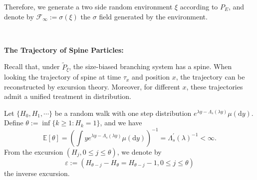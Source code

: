 \documentclass[]{article}
\numberwithin{equation}{section}
\theoremstyle{thmstyleone}%
\theoremstyle{thmstyletwo}%
\theoremstyle{thmstylethree}%
\theoremstyle{thmstylefour}%
\theoremstyle{thmstylefive}%
\theoremstyle{thmstylesix}%
\renewcommand{\d}{\mathrm{d}}
\newcommand{\E}{\mathbb{E}}
\begin{document}
	
	Therefore, we generate a two side random environment $\xi$ according to $P_E$, and denote by $\mathcal{F}_\infty:=\sigma(\xi)$ the $\sigma$ field generated by the environment.
	
	\
	
	\noindent\textbf{The Trajectory of Spine Particles:}
	
	Recall that, under $\tilde{P}_\xi$, the size-biased branching system has a spine. When looking the trajectory of spine at time $\tau_x$ and position $x$, the trajectory can be reconstructed by excursion theory. Moreover, for different $x$, these trajectories admit a unified treatment in distribution.
	
	Let $\{H_0,H_1,\cdots\}$ be a random walk with one step distribution $e^{\lambda y-\Lambda_s(\lambda y)} \mu(\d y)$. Define $\theta:= \inf\{k\geqslant1:H_k=1\}$, and we have \begin{equation}\label{mean of theta}\E[\theta] = \left( \int ye^{\lambda y-\Lambda_s(\lambda y)} \mu(\d y) \right)^{-1} = \Lambda^\prime_s(\lambda)^{-1}<\infty.\end{equation} From the excursion $\left(H_{j},0\leqslant j\leqslant \theta\right)$, we denote by
	\begin{equation}\label{excursion}
		\varepsilon:=\left(H_{\theta-j}-H_{\theta}=H_{\theta-j}-1,0\leqslant j\leqslant \theta\right)
	\end{equation}
	the inverse excursion.
	
\end{document}
